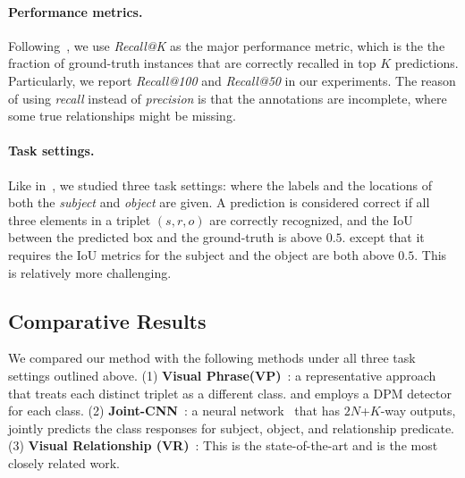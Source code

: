 \documentclass[10pt,twocolumn,letterpaper]{article}
\begin{document}
\paragraph{Performance metrics.}%
Following~\cite{lu2016visual}, we use \emph{Recall@K} as the major performance metric,
which is the the fraction of ground-truth instances that are correctly recalled in top $K$ predictions.
Particularly, we report \emph{Recall@100} and \emph{Recall@50} in our experiments.
The reason of using \emph{recall} instead of \emph{precision} is that
the annotations are incomplete, where some true relationships might be missing.

\paragraph{Task settings.}%
Like in~\cite{lu2016visual}, we studied three task settings:
where the labels and the locations of both the \emph{subject} and \emph{object} are given.
A prediction is considered correct if all three elements in a triplet $(s, r, o)$ are
correctly recognized, and the IoU between the predicted box and the ground-truth is
above $0.5$.
except that it requires the IoU metrics for the subject and the object
are both above $0.5$. This is relatively more challenging.

\subsection{Comparative Results}%

We compared our method with the following methods under all three task settings outlined above.
(1) \textbf{Visual Phrase(VP)}~\cite{sadeghi2011recognition}:
a representative approach that treats each distinct triplet as a different class.
and employs a DPM detector~\cite{lsvm-pami} for each class.
(2) \textbf{Joint-CNN}~\cite{fang2015captions}:
a neural network~\cite{Simonyan14c} that has $2N$+$K$-way outputs, jointly predicts the class responses
for subject, object, and relationship predicate.
(3) \textbf{Visual Relationship (VR)}~\cite{lu2016visual}:
This is the state-of-the-art and is the most closely related work.
\end{document}
